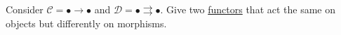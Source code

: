 Consider $\mathcal{C}=\boxed{\bullet \rightarrow \bullet}$ and $\mathcal{D}=\boxed{\bullet \rightrightarrows \bullet}$. Give two \href{doc/1 math/Seven Sketches in Compositionality/Chapter 3: Databases/3 Functors, natural transformations, and databases/2 Functors/1 Functor}{functors} that act the same on objects but differently on morphisms.